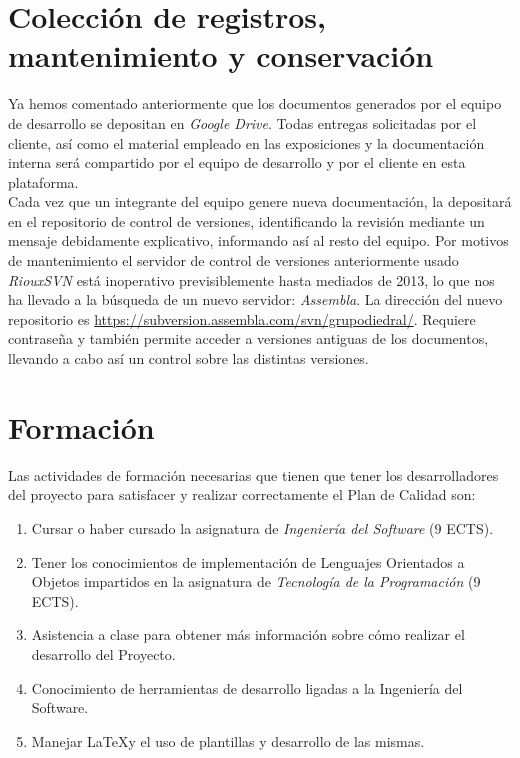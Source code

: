 \documentclass[11pt, a4paper, twoside, titlepage]{article}
\begin{document}

	\section{Colección de registros, mantenimiento y conservación} %
		Ya hemos comentado anteriormente que los documentos generados por el equipo de desarrollo se depositan en \textit{Google Drive}. Todas entregas solicitadas por el cliente, así como el material empleado en las exposiciones y la documentación interna será compartido por el equipo de desarrollo y por el cliente en esta plataforma. \\

		Cada vez que un integrante del equipo genere nueva documentación, la depositará en el repositorio de control de versiones,  identificando la revisión mediante un mensaje debidamente explicativo, informando así al resto del equipo. Por motivos de mantenimiento el servidor de control de versiones anteriormente usado \textit{RiouxSVN} está inoperativo previsiblemente hasta mediados de 2013, lo que nos ha llevado a la búsqueda de un nuevo servidor: \textit{Assembla}. La dirección del nuevo repositorio es \url{https://subversion.assembla.com/svn/grupodiedral/}. Requiere contraseña y también permite acceder a versiones antiguas de los documentos, llevando a cabo así un control sobre las distintas versiones.

	\section{Formación} %
		Las actividades de formación necesarias que tienen que tener los desarrolladores del proyecto  para satisfacer y realizar correctamente el Plan de Calidad son:

		\begin{enumerate}
			\item Cursar o haber cursado la asignatura de \textit{Ingeniería del Software} (9 ECTS).
			\item Tener los conocimientos de implementación de Lenguajes Orientados a Objetos impartidos en la asignatura de \textit{Tecnología de la Programación} (9 ECTS).
			\item Asistencia a clase para obtener más información sobre cómo realizar el desarrollo del Proyecto.
			\item Conocimiento de herramientas de desarrollo ligadas a la Ingeniería del Software.
			\item Manejar \LaTeX y el uso de plantillas y desarrollo de las mismas.
		\end{enumerate}
		
\end{document}
